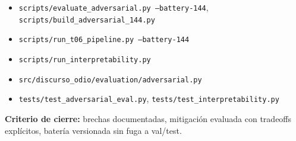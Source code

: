 \begin{itemize}[noitemsep]
  \item \texttt{scripts/evaluate\_adversarial.py --battery-144}, \texttt{scripts/build\_adversarial\_144.py}
  \item \texttt{scripts/run\_t06\_pipeline.py --battery-144}
  \item \texttt{scripts/run\_interpretability.py}
  \item \texttt{src/discurso\_odio/evaluation/adversarial.py}
  \item \texttt{tests/test\_adversarial\_eval.py}, \texttt{tests/test\_interpretability.py}
\end{itemize}

\textbf{Criterio de cierre:} brechas documentadas, mitigación evaluada con tradeoffs explícitos, batería versionada sin fuga a val/test.
